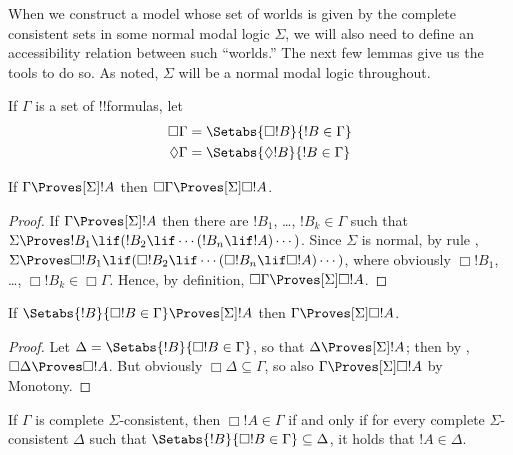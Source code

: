 \documentclass[../../../include/open-logic-section]{subfiles}
\begin{document}

  
When we construct a model whose set of worlds is given by the complete
consistent sets in some normal modal logic $\Sigma$, we will also need
to define an accessibility relation between such ``worlds.'' The next
few lemmas give us the tools to do so. As noted, $\Sigma$ will be a
normal modal logic throughout.

\begin{defn}
  If $\Gamma$ is a set of !!{formula}s, let
  \begin{align*}
    \Box\Gamma & = \Setabs{\Box !B}{!B \in \Gamma}\\
    \Diamond\Gamma & = \Setabs{\Diamond !B}{!B \in \Gamma}\\
  \end{align*}
\end{defn}

\begin{lem}
  If $\Gamma \Proves[\Sigma] !A$ then $\Box\Gamma \Proves[\Sigma] \Box
  !A$.
\end{lem}

\begin{proof}
  If $\Gamma \Proves[\Sigma] !A$ then there are $!B_1$, \dots, $!B_k
  \in \Gamma$ such that $\Sigma \Proves !B_1 \lif (!B_2 \lif \cdots
  (!B_n \lif !A)\cdots)$. Since $\Sigma$ is normal, by rule \RK{},
  $\Sigma \Proves \Box!B_1 \lif (\Box!B_2 \lif \cdots (\Box!B_n \lif
  \Box!A)\cdots)$, where obviously $\Box!B_1$, \dots, $\Box!B_k \in
  \Box\Gamma$. Hence, by definition, $\Box\Gamma \Proves[\Sigma] \Box
  !A$.
\end{proof}

\begin{lem}
  If $\Setabs{!B}{\Box !B \in \Gamma} \Proves[\Sigma] !A$ then
  $\Gamma \Proves[\Sigma] \Box!A$.
\end{lem}

\begin{proof}
  Let $\Delta = \Setabs{!B}{\Box !B \in \Gamma}$, so that $\Delta
  \Proves[\Sigma] !A$; then by ,
  $\Box\Delta \Proves \Box!A$. But obviously
  $\Box\Delta \subseteq \Gamma$, so also $\Gamma
  \Proves[\Sigma] \Box!A$ by Monotony.
\end{proof}

\begin{thm}
  If $\Gamma$ is complete $\Sigma$-consistent, then $\Box !A \in
  \Gamma$ if and only if for every complete $\Sigma$-consistent
  $\Delta$ such that $\Setabs{!B}{\Box !B \in \Gamma} \subseteq
  \Delta$, it holds that $!A \in \Delta$.
\end{thm}
\end{document}
